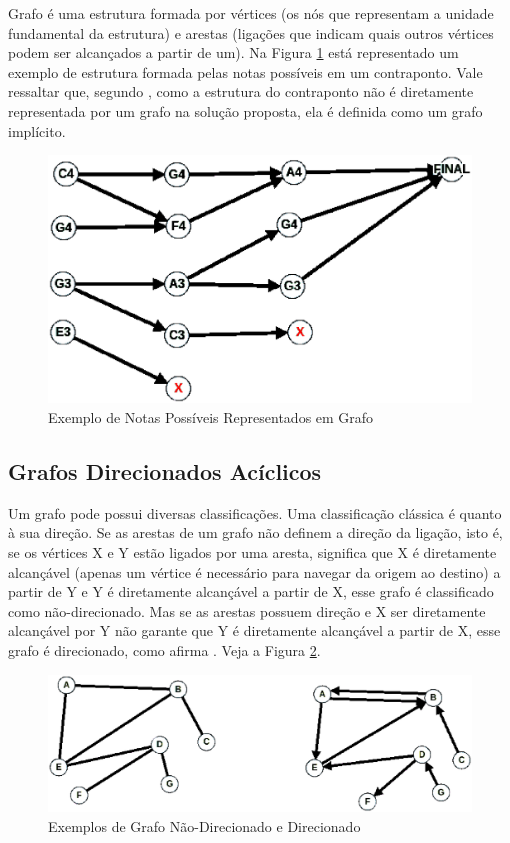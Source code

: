     Grafo é uma estrutura formada por vértices (os nós que representam a unidade fundamental da estrutura) e arestas (ligações que indicam quais outros vértices podem ser alcançados a partir de um). Na Figura \ref{grafonotas} está representado um exemplo de estrutura formada pelas notas possíveis em um contraponto. Vale ressaltar que, segundo , como a estrutura do contraponto não é diretamente representada por um grafo na solução proposta, ela é definida como um grafo implícito.

    \begin{figure}[htb]
      \centering
      \includegraphics[scale=0.55]{figuras/grafonotas.eps}
      \caption{Exemplo de Notas Possíveis Representados em Grafo}
      \label{grafonotas}
    \end{figure}

    \subsection[Grafos Direcionados Acíclicos]{Grafos Direcionados Acíclicos}

      Um grafo pode possui diversas classificações. Uma classificação clássica é quanto à sua direção. Se as arestas de um grafo não definem a direção da ligação, isto é, se os vértices X e Y estão ligados por uma aresta, significa que X é diretamente alcançável (apenas um vértice é necessário para navegar da origem ao destino) a partir de Y e Y é diretamente alcançável a partir de X, esse grafo é classificado como não-direcionado. Mas se as arestas possuem direção e X ser diretamente alcançável por Y não garante que Y é diretamente alcançável a partir de X, esse grafo é direcionado, como afirma . Veja a Figura \ref{nodirxdir}.

      \begin{figure}[htb]
        \centering
        \includegraphics[scale=0.47]{figuras/nodirxdir.eps}
        \caption{Exemplos de Grafo Não-Direcionado e Direcionado}
        \label{nodirxdir}
      \end{figure}

